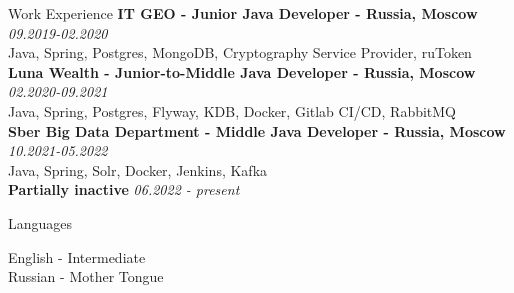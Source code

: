 \documentclass{resume} %
\begin{document}

\begin{rSection}{Work Experience}
{\bf IT GEO - Junior Java Developer - Russia, Moscow} \hfill {\em 09.2019-02.2020} 
\\ Java, Spring, Postgres, MongoDB, Cryptography Service Provider, ruToken \\
{\bf Luna Wealth - Junior-to-Middle Java Developer - Russia, Moscow} \hfill {\em 02.2020-09.2021} 
\\ Java, Spring, Postgres, Flyway, KDB, Docker, Gitlab CI/CD, RabbitMQ \\
{\bf Sber Big Data Department - Middle Java Developer - Russia, Moscow} \hfill {\em 10.2021-05.2022} 
\\ Java, Spring, Solr, Docker, Jenkins, Kafka \\
{\bf Partially inactive } \hfill {\em 06.2022 - present} 
\\
\end{rSection}


\begin{rSection}{Languages}

English - Intermediate \\
Russian - Mother Tongue


\end{rSection}
\end{document}
